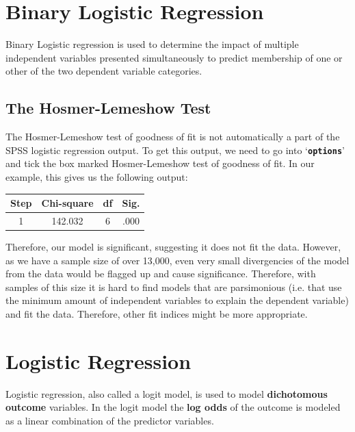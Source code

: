 \documentclass[a4paper,12pt]{article}
\begin{document}
\section{Binary Logistic Regression}
Binary Logistic regression is used to determine the impact of multiple independent variables
presented simultaneously to predict membership of one or other of the two
dependent variable categories.




\subsection{The Hosmer-Lemeshow Test}

The Hosmer-Lemeshow test of goodness of fit is not automatically a part of the SPSS logistic regression output. To get this output, we need to go into `\textbf{\texttt{options}}’ and tick the box marked Hosmer-Lemeshow test of goodness of fit. In our example, this gives us the following output:

\begin{tabular}{|c|c|c|c|}
\hline  Step	& Chi-square&	df 	 & Sig. \\ \hline
 1	 & 142.032	& 6	 &.000 \\ 
\hline 
\end{tabular} 

Therefore, our model is significant, suggesting it does not fit the data. However, as we have a sample size of over 13,000, even very small divergencies of the model from the data would be flagged up and cause significance. Therefore, with samples of this size it is hard to find models that are parsimonious (i.e. that use the minimum amount of independent variables to explain the dependent variable) and fit the data. Therefore, other fit indices might be more appropriate.

\section{Logistic Regression}
Logistic regression, also called a logit model, is used to model \textbf{dichotomous outcome} variables. 
In the logit model the \textbf{log odds} of the outcome is modeled as a linear combination of the predictor variables.
\end{document}
